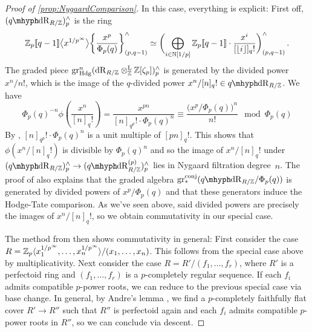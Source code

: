 \documentclass[DIV=12,numbers=enddot,leqno,bibliography=totoc]{scrartcl}
\begin{document}
\begin{proof}[Proof of \cref{prop:NygaardComparison}]
		In this case, everything is explicit: First off, $(\qdeRham_{R/\IZ})_p^\complete$ is the ring
		\begin{equation*}
			\IZ_p\qpower\bigl\langle x^{1/p^\infty}\bigr\rangle\left\{\frac{x^p}{\Phi_p(q)}\right\}_{(p,q-1)}^\complete\simeq \biggl(\bigoplus_{i\in\IN[1/p]}\IZ_p\qpower\cdot\frac{x^i}{[\lfloor i\rfloor]_q!}\biggr)_{(p,q-1)}^\complete\,.
		\end{equation*}
		The graded piece $\operatorname{gr}_{\mathrm{Hdg}}^n(\mathrm{dR}_{R/\mathbb{Z}}\otimes^{\mathrm{L}}_{\mathbb{Z}}\mathbb{Z}[\zeta_p])_p^\wedge$ is generated by the divided power $x^n/n!$, which is the image of the $q$-divided power $x^n/[n]_q!\in \qdeRham_{R/\IZ}$. We have
		\begin{equation*}
			\Phi_p(q)^{-n}\phi\left(\frac{x^n}{[n]_q!}\right)=\frac{x^{pn}}{[n]_{q^p}!\cdot\Phi_p(q)^n}\equiv\frac{\bigl(x^p/\Phi_p(q)\bigr)^n}{n!} \mod \Phi_p(q)
		\end{equation*}
		By \cite[Lemma~]{Prismatic}, $[n]_{q^p}!\cdot\Phi_p(q)^n$ is a unit multiple of $[pn]_q!$. This shows that $\phi(x^n/[n]_q!)$ is divisible by $\Phi_p(q)^n$ and so the image of $x^n/[n]_q!$ under $(\qdeRham_{R/\IZ})_p^\complete\rightarrow (\qdeRham_{R/\IZ}^{(p)})_p^\complete$ lies in Nygaard filtration degree~$n$. The proof of \cite[Lemma~]{Prismatic} also explains that the graded algebra $\gr_*^\mathrm{conj}(\qdeRham_{R/\IZ}/\Phi_p(q))$ is generated by divided powers of $x^p/\Phi_p(q)$ and that these generators induce the Hodge-Tate comparison. As we've seen above, said divided powers are precisely the images of $x^n/[n]_q!$, so we obtain commutativity in our special case.
		
		The method from \cite[\S{}]{Prismatic} then shows commutativity in general: First consider the case $R=\mathbb{Z}_p\langle x_1^{1/p^\infty},\dotsc,x_n^{1/p^\infty}\rangle/(x_1,\dotsc,x_n)$. This follows from the special case above by multiplicativity. Next consider the case $R=R'/(f_1,\dotsc,f_r)$, where $R'$ is a perfectoid ring and $(f_1,\dotsc,f_r)$ is a $p$-completely regular sequence. If each $f_i$ admits compatible $p$-power roots, we can reduce to the previous special case via base change. In general, by Andre's lemma \cite[Theorem~]{Prismatic}, we find a $p$-completely faithfully flat cover $R'\rightarrow R''$ such that $R''$ is perfectoid again and each $f_i$ admits compatible $p$-power roots in $R''$, so we can conclude via descent.
		

\end{proof}
\end{document}
